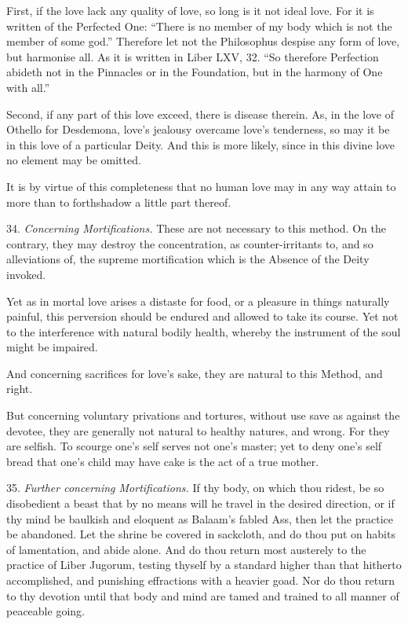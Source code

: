 First, if the love lack any quality of love, so long is it not ideal love. For it is written of the Perfected One: \enquote{There is no member of my body which is not the member of some god.} Therefore let not the Philosophus despise any form of love, but harmonise all. As it is written in Liber LXV, 32. \enquote{So therefore Perfection abideth not in the Pinnacles or in the Foundation, but in the harmony of One with all.}

Second, if any part of this love exceed, there is disease therein. As, in the love of Othello for Desdemona, love's jealousy overcame love's tenderness, so may it be in this love of a particular Deity. And this is more likely, since in this divine love no element may be omitted.

It is by virtue of this completeness that no human love may in any way attain to more than to forthshadow a little part thereof.

34. \textit{Concerning Mortifications.} These are not necessary to this method. On the contrary, they may destroy the concentration, as counter-irritants to, and so alleviations of, the supreme mortification which is the Absence of the Deity invoked.

Yet as in mortal love arises a distaste for food, or a pleasure in things naturally painful, this perversion should be endured and allowed to take its course. Yet not to the interference with natural bodily health, whereby the instrument of the soul might be impaired.

And concerning sacrifices for love's sake, they are natural to this Method, and right.

But concerning voluntary privations and tortures, without use save as against the devotee, they are generally not natural to healthy natures, and wrong. For they are selfish. To scourge one's self serves not one's master; yet to deny one's self bread that one's child may have cake is the act of a true mother.

35. \textit{Further concerning Mortifications.} If thy body, on which thou ridest, be so disobedient a beast that by no means will he travel in the desired direction, or if thy mind be baulkish and eloquent as Balaam's fabled Ass, then let the practice be abandoned. Let the shrine be covered in sackcloth, and do thou put on habits of lamentation, and abide alone. And do thou return most austerely to the practice of Liber Jugorum, testing thyself by a standard higher than that hitherto accomplished, and punishing effractions with a heavier goad. Nor do thou return to thy devotion until that body and mind are tamed and trained to all manner of peaceable going.


